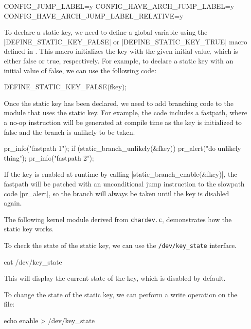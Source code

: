 \documentclass[10pt, oneside]{book}
\begin{document}
\begin{code}
CONFIG_JUMP_LABEL=y
CONFIG_HAVE_ARCH_JUMP_LABEL=y
CONFIG_HAVE_ARCH_JUMP_LABEL_RELATIVE=y
\end{code}

To declare a static key, we need to define a global variable using the \cpp|DEFINE_STATIC_KEY_FALSE| or \cpp|DEFINE_STATIC_KEY_TRUE| macro defined in .
This macro initializes the key with the given initial value, which is either false or true, respectively. For example, to declare a static key with an initial value of false, we can use the following code:

\begin{code}
DEFINE_STATIC_KEY_FALSE(fkey);
\end{code}

Once the static key has been declared, we need to add branching code to the module that uses the static key.
For example, the code includes a fastpath, where a no-op instruction will be generated at compile time as the key is initialized to false and the branch is unlikely to be taken.

\begin{code}
pr_info("fastpath 1\n");
if (static_branch_unlikely(&fkey))
    pr_alert("do unlikely thing\n");
pr_info("fastpath 2\n");
\end{code}

If the key is enabled at runtime by calling \cpp|static_branch_enable(&fkey)|, the fastpath will be patched with an unconditional jump instruction to the slowpath code \cpp|pr_alert|, so the branch will always be taken until the key is disabled again.

The following kernel module derived from \verb|chardev.c|, demonstrates how the static key works.


To check the state of the static key, we can use the \verb|/dev/key_state| interface.

\begin{codebash}
cat /dev/key_state
\end{codebash}

This will display the current state of the key, which is disabled by default.

To change the state of the static key, we can perform a write operation on the file:

\begin{codebash}
echo enable > /dev/key_state
\end{codebash}
\end{document}
